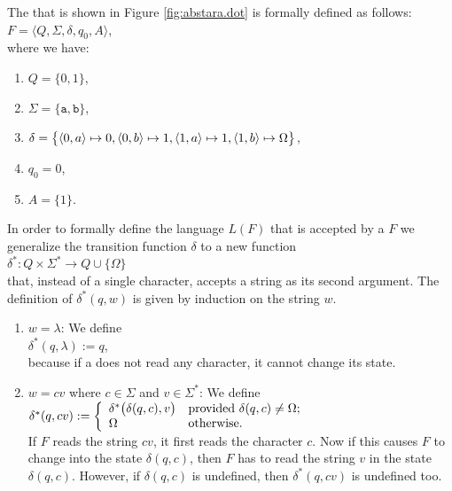 \exampleEng
The  that is shown in Figure  \ref{fig:abstara.dot} is formally defined as follows:
\\[0.2cm]
\hspace*{1.3cm}
$F = \langle Q, \Sigma, \delta, q_0, A \rangle$,
\\[0.2cm]
where we have:
\begin{enumerate}
\item $Q = \{ 0, 1 \}$,
\item $\Sigma = \{ \texttt{a}, \texttt{b} \}$,
\item $\delta = \bigl\{ 
                        \pair(0,a) \mapsto 0, 
                        \pair(0,b) \mapsto 1, 
                        \pair(1,a) \mapsto 1, 
                        \pair(1,b) \mapsto \Omega 
                \bigr\}$,
\item $q_0 = 0$,
\item $A = \{ 1 \}$.
\end{enumerate}
In order to formally define the language $L(F)$ that is accepted by a  $F$
we generalize the transition function $\delta$ to a new function
\\[0.2cm]
\hspace*{1.3cm}
$\delta^*: Q \times \Sigma^* \rightarrow Q \cup \{ \Omega \}$
\\[0.2cm]
that, instead of a single character, accepts a string as its second argument.  The definition of
$\delta^*(q, w)$ is given by induction on the string $w$.
\begin{enumerate}
\item[I.A.] $w = \lambda$:  We define
            \\[0.2cm]
            \hspace*{1.3cm}
            $\delta^*(q, \lambda) := q$,
            \\[0.2cm]
            because if a  does not read any character, it cannot change its state. 
\item[I.S.] $w = cv$ where $c \in \Sigma$ and $v  \in \Sigma^*$:  We define
            \\[0.2cm]
            \hspace*{1.3cm}
            $\delta^*(q, cv) := \left\{
            \begin{array}[c]{ll}              
            \delta^*\bigl(\delta(q,c),v\bigr) & \mbox{provided $\delta(q,c) \not= \Omega$;} \\
            \Omega                            & \mbox{otherwise}.
            \end{array}
            \right.
            $
            \\[0.2cm]
            If $F$ reads the string  $cv$, it first reads the character $c$.  Now if this causes  $F$
            to change into the state $\delta(q,c)$, then $F$ has to read the string $v$ in the state
            $\delta(q,c)$.  However, 
            if  $\delta(q,c)$ is undefined, then  $\delta^*(q,cv)$ is undefined too.
\end{enumerate}

